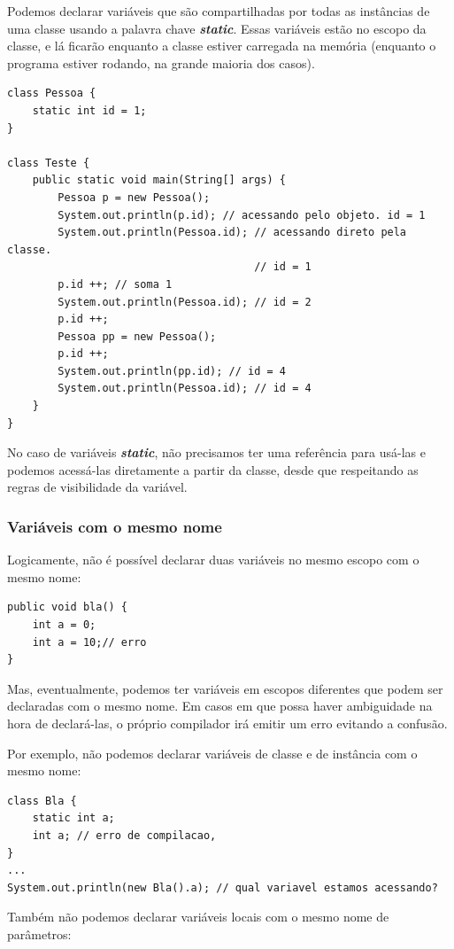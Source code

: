 \documentclass[12pt]{article}
\begin{document}
Podemos declarar variáveis que são compartilhadas por todas as instâncias de uma classe usando a palavra chave \textbf{\textit{static}}. Essas variáveis estão no escopo da classe, e lá ficarão enquanto a classe estiver carregada na memória (enquanto o programa estiver rodando, na grande maioria dos casos).

\begin{lstlisting}
class Pessoa {
	static int id = 1;
}
	
class Teste {
	public static void main(String[] args) {
		Pessoa p = new Pessoa();
		System.out.println(p.id); // acessando pelo objeto. id = 1
		System.out.println(Pessoa.id); // acessando direto pela classe.
		                               // id = 1
		p.id ++; // soma 1
		System.out.println(Pessoa.id); // id = 2
		p.id ++;
		Pessoa pp = new Pessoa(); 
		p.id ++;
		System.out.println(pp.id); // id = 4
		System.out.println(Pessoa.id); // id = 4
	}
}
\end{lstlisting}

No caso de variáveis \textbf{\textit{static}}, não precisamos ter uma referência para usá-las e podemos acessá-las diretamente a partir da classe, desde que respeitando as regras de visibilidade da variável.

\subsubsection{Variáveis com o mesmo nome}

Logicamente, não é possível declarar duas variáveis no mesmo escopo com o mesmo nome:

\begin{lstlisting}
public void bla() {
	int a = 0;
	int a = 10;// erro
}
\end{lstlisting}

Mas, eventualmente, podemos ter variáveis em escopos diferentes que podem ser declaradas com o mesmo nome. Em casos em que possa haver ambiguidade na hora de declará-las, o próprio compilador irá emitir um erro evitando a confusão.

Por exemplo, não podemos declarar variáveis de classe e de instância com o mesmo nome:

\begin{lstlisting}
class Bla {
	static int a;
	int a; // erro de compilacao,
}
...
System.out.println(new Bla().a); // qual variavel estamos acessando?
\end{lstlisting}

Também não podemos declarar variáveis locais com o mesmo nome de parâmetros:
\end{document}
